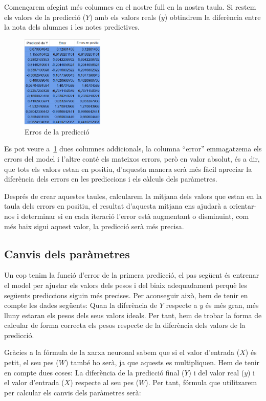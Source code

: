 Començarem afegint més columnes en el nostre full en la nostra taula. Si restem els valors de la predicció ($Y$) amb els valors reals ($y$) obtindrem la diferència entre la nota dels alumnes i les notes predictives.

\begin{figure}[h!]
    \centering
    \includegraphics[width=0.35\textwidth]{./figures/Errors.png}
    \caption{Erros de la predicció}
    \label{f:errors}
\end{figure}

Es pot veure a~\ref{f:errors} dues columnes addicionals, la columna ``error'' emmagatzema els errors del model i l'altre conté els mateixos errors, però en valor absolut, és a dir, que tots els valors estan en positiu, d'aquesta manera serà més fàcil apreciar la diferència dels errors en les prediccions i els càlculs dels paràmetres.

Després de crear aquestes taules, calcularem la mitjana dels valors que estan en la taula dels errors en positiu, el resultat d'aquesta mitjana ens ajudarà a orientar-nos i determinar si en cada iteració l'error està augmentant o disminuint, com més baix sigui aquest valor, la predicció serà més precisa.

\subsection{Canvis dels paràmetres}
Un cop tenim la funció d'error de la primera predicció, el pas següent és entrenar el model per ajustar els valors dels pesos i del biaix adequadament perquè les següents prediccions siguin més precises.
Per aconseguir això, hem de tenir en compte les dades següents: Quan la diferència de $Y$ respecte a $y$ és més gran, més lluny estaran els pesos dels seus valors ideals. Per tant, hem de trobar la forma de calcular de forma correcta els pesos respecte de la diferència dels valors de la predicció.

Gràcies a la fórmula de la xarxa neuronal sabem que si el valor d'entrada ($X$) és petit, el seu pes ($W$) també ho serà, ja que aquests es multipliquen. Hem de tenir en compte dues coses: La diferència de la predicció final ($Y$) i del valor real ($y$) i el valor d'entrada ($X$) respecte al seu pes ($W$). Per tant, fórmula que utilitzarem per calcular els canvis dels paràmetres serà:


